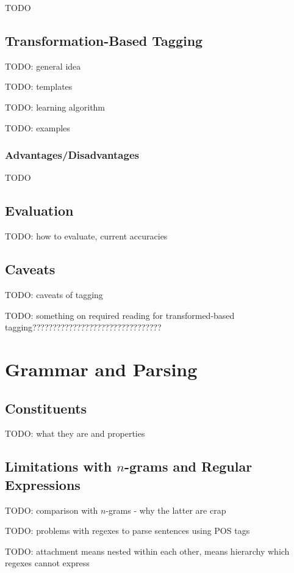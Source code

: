 \documentclass{article}
\begin{document}
TODO

\subsection{Transformation-Based Tagging}

TODO: general idea

TODO: templates

TODO: learning algorithm

TODO: examples

\subsubsection{Advantages/Disadvantages}

TODO

\subsection{Evaluation}

TODO: how to evaluate, current accuracies

\subsection{Caveats}

TODO: caveats of tagging


TODO: something on required reading for transformed-based tagging????????????????????????????????

\section{Grammar and Parsing}

\subsection{Constituents}

TODO: what they are and properties

\subsection{Limitations with $n$-grams and Regular Expressions}

TODO: comparison with $n$-grams - why the latter are crap

TODO: problems with regexes to parse sentences using POS tags

TODO: attachment means nested within each other, means hierarchy which regexes cannot express
\end{document}
